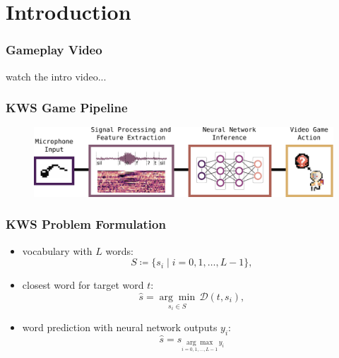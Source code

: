 
\section{Introduction}
\begin{frame}
  \frametitle{Gameplay Video}
  watch the intro video...
\end{frame}

\begin{frame}
  \frametitle{KWS Game Pipeline}
  \begin{figure} \includegraphics[width=1.0\textwidth]{../1_intro/figs/intro_kws.pdf} \end{figure}
\end{frame}

\begin{frame}
  \frametitle{KWS Problem Formulation}
  \begin{itemize}
    \item vocabulary with $L$ words:
    \begin{equation}\label{eq:intro_kws_dict}
      S \coloneqq \{s_i \mid i = 0, 1, \dots, L - 1\},
    \end{equation}

    \item closest word for target word $t$:
    \begin{equation}\label{eq:intro_kws_task}
      \hat{s} = \underset{s_i \in S}{\arg \min} \, \mathcal{D}(t, s_i),
    \end{equation}

    \item word prediction with neural network outputs $y_i$:
    \begin{equation}\label{eq:intro_kws_class}
      \hat{s} = s_{\underset{i = 0, 1, \dots, L - 1}{\arg \max} \, y_i}
    \end{equation}

  \end{itemize}
\end{frame}